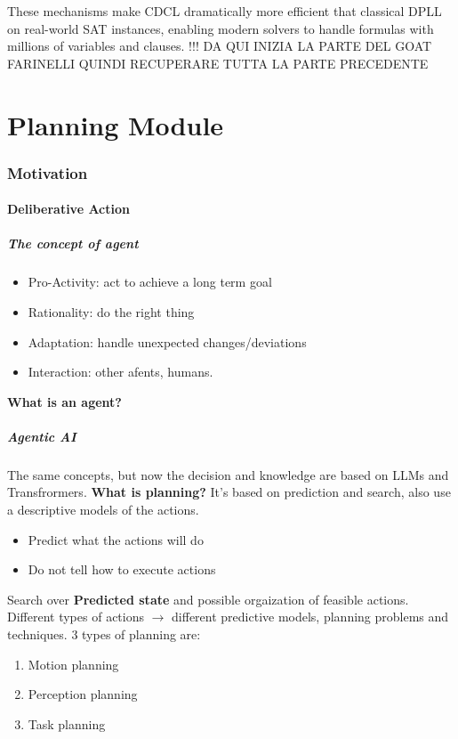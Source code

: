 \documentclass[a4paper]{article}
\theoremstyle{definition}
\begin{document}
These mechanisms make CDCL dramatically more efficient that classical DPLL on real-world SAT instances, enabling modern solvers to handle formulas 
with millions of variables and clauses.
!!! DA QUI INIZIA LA PARTE DEL GOAT FARINELLI QUINDI RECUPERARE TUTTA LA PARTE PRECEDENTE

\part{Planning Module}
\section{Motivation}
\subsection{Deliberative Action}

\subsubsection{The concept of agent}
\begin{itemize}
    \item Pro-Activity: act to achieve a long term goal 
    \item Rationality: do the right thing 
    \item Adaptation: handle unexpected changes/deviations 
    \item Interaction: other afents, humans.
\end{itemize}
\textbf{What is an agent?}
\vspace{1em}
\noindent
\newline

\subsubsection{Agentic AI}
The same concepts, but now the decision and knowledge are based on LLMs and Transfrormers.
\vspace{1em}
\noindent
\newline
\textbf{What is planning?}
\vspace{1em}
\noindent
\newline
It's based on prediction and search, also use a descriptive models of the actions. 
\begin{itemize}
    \item Predict what the actions will do 
    \item Do not tell how to execute actions 
\end{itemize}
Search over \textbf{Predicted state} and possible orgaization of feasible actions. Different types of actions \( \rightarrow \) different 
predictive models, planning problems and techniques.
3 types of planning are:
\begin{enumerate}
    \item Motion planning 
    \item Perception planning 
    \item Task planning
\end{enumerate}
\end{document}
